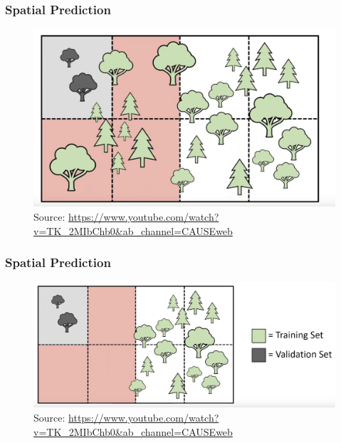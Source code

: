 \documentclass[
  shownotes,
  xcolor={svgnames},
  hyperref={colorlinks,citecolor=DarkBlue,linkcolor=andesred,urlcolor=DarkBlue}
  , aspectratio=169]{beamer}
\begin{document}
\begin{frame}[fragile]
\frametitle{Spatial Prediction}

\begin{figure}[H] \centering
            \captionsetup{justification=centering}
\includegraphics[scale=0.4]{figures/spatial_cross/fig14.png}
\\
\tiny
Source: \url{https://www.youtube.com/watch?v=TK_2MIbChb0&ab_channel=CAUSEweb}
 \end{figure}
\end{frame}

\begin{frame}[fragile]
\frametitle{Spatial Prediction}

\begin{figure}[H] \centering
            \captionsetup{justification=centering}
\includegraphics[scale=0.3]{figures/spatial_cross/fig15.png}
\\
\tiny
Source: \url{https://www.youtube.com/watch?v=TK_2MIbChb0&ab_channel=CAUSEweb}
 \end{figure}
\end{frame}
\end{document}
